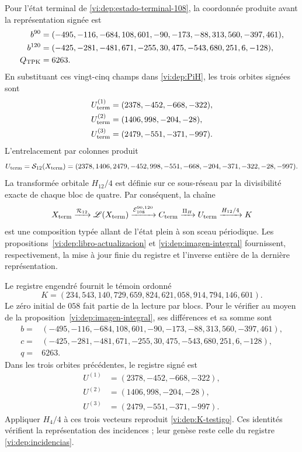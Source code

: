 Pour l’état terminal de \eqref{vi:dep:estado-terminal-108}, la coordonnée
produite avant la représentation signée est
\begin{align}
 b^{90}={}&(-495,-116,-684,108,601,-90,
              -173,-88,313,560,-397,461),\notag\\
 b^{120}={}&(-425,-281,-481,671,-255,30,
               475,-543,680,251,6,-128),\notag\\
 Q_{\rm TPK}={}&6263.
 \label{vi:dep:canales-terminales}
\end{align}
En substituant ces vingt-cinq champs dans \eqref{vi:dep:PiH}, les trois
orbites signées sont
\begin{align*}
 U_{\rm term}^{(1)}&=(2378,-452,-668,-322),\\
 U_{\rm term}^{(2)}&=(1406,998,-204,-28),\\
 U_{\rm term}^{(3)}&=(2479,-551,-371,-997).
\end{align*}
L’entrelacement par colonnes produit
\begin{equation}
 U_{\rm term}=\mathcal S_{12}(X_{\rm term})
 =(2378,1406,2479,-452,998,-551,-668,-204,-371,-322,-28,-997).
 \label{vi:dep:U-terminal}
\end{equation}
La transformée orbitale \(H_{12}/4\) est définie sur ce sous-réseau par
la divisibilité exacte de chaque bloc de quatre. Par conséquent, la chaîne
\begin{equation}
 X_{\rm term}\xrightarrow{\mathcal R_{12}}\mathscr L(X_{\rm term})
 \xrightarrow{\mathcal E_{108}^{90,120}}C_{\rm term}
 \xrightarrow{\Pi_H}U_{\rm term}
 \xrightarrow{H_{12}/4}K
 \label{vi:dep:cadena-terminal-completa}
\end{equation}
est une composition typée allant de l’état plein à son sceau périodique.
Les propositions~\ref{vi:dep:libro-actualizacion} et
\ref{vi:dep:imagen-integral} fournissent, respectivement, la mise à jour
finie du registre et l’inverse entière de la dernière représentation.

Le registre engendré fournit le témoin ordonné
\begin{equation}
 K=(234,543,140,729,659,824,621,058,914,794,146,601).
 \label{vi:dep:K-testigo}
\end{equation}
Le zéro initial de \(058\) fait partie de la lecture par blocs.
Pour le vérifier au moyen de la proposition~\ref{vi:dep:imagen-integral}, ses différences
et sa somme sont
\[
\begin{split}
b={}&(-495,-116,-684,108,601,-90,-173,-88,313,560,-397,461),\\
c={}&(-425,-281,-481,671,-255,30,475,-543,680,251,6,-128),\\
q={}&6263.
\end{split}
\]
Dans les trois orbites précédentes, le registre signé est
\[
 \begin{aligned}
 U^{(1)}&=(2378,-452,-668,-322),\\
 U^{(2)}&=(1406,998,-204,-28),\\
 U^{(3)}&=(2479,-551,-371,-997).
 \end{aligned}
\]
Appliquer \(H_4/4\) à ces trois vecteurs reproduit
\eqref{vi:dep:K-testigo}. Ces identités vérifient la représentation des
incidences ; leur genèse reste celle du registre
\eqref{vi:dep:incidencias}.

